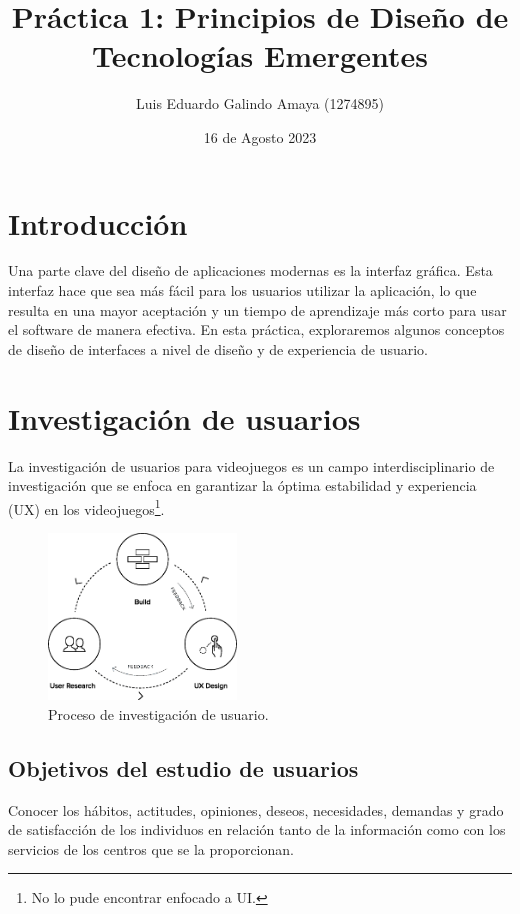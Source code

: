 \documentclass[11pt]{article}
\author{Luis Eduardo Galindo Amaya (1274895)}
\date{16 de Agosto 2023}
\title{Práctica 1: Principios de Diseño de Tecnologías Emergentes}
\begin{document}

\tableofcontents
\pagebreak


\section{Introducción}
\label{sec:org4ea7af9}
Una parte clave del diseño de aplicaciones modernas es la interfaz gráfica. 
Esta interfaz hace que sea más fácil para los usuarios utilizar la aplicación, 
lo que resulta en una mayor aceptación y un tiempo de aprendizaje más corto para
usar el software de manera efectiva. En esta práctica, exploraremos algunos
conceptos de diseño de interfaces a nivel de diseño y de experiencia de usuario.

\section{Investigación de usuarios}
\label{sec:org9c645bd}
\autocite{drachen2018games} La investigación de usuarios para videojuegos 
es un campo interdisciplinario de investigación que se enfoca en garantizar la 
óptima estabilidad y experiencia (UX) en los videojuegos\footnote{No lo pude encontrar enfocado a UI.}.

\begin{figure}[htbp]
\centering
\includegraphics[width=5cm]{images/iusuario.png}
\caption{Proceso de investigación de usuario.}
\end{figure}

\subsection{Objetivos del estudio de usuarios}
\label{sec:orge2ee2e6}
\autocite{Yépez_2021} Conocer los hábitos, actitudes, opiniones, deseos, 
necesidades, demandas y grado de satisfacción de los individuos en relación 
tanto de la información como con los servicios de los centros que se la 
proporcionan.
\end{document}
